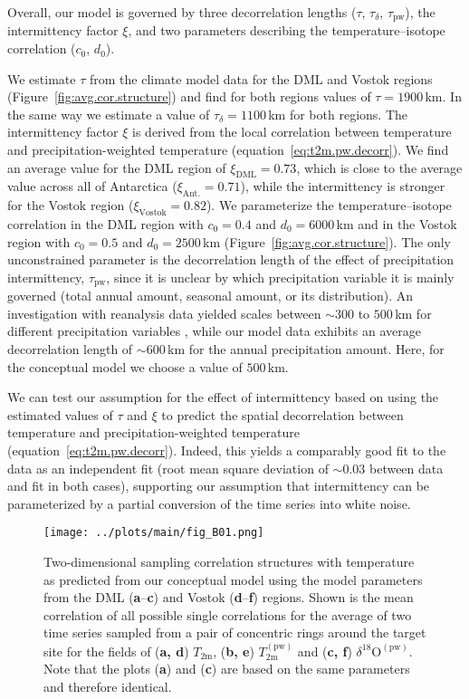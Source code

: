 \documentclass[draft]{agujournal2019}
\begin{document}
Overall, our model is governed by three decorrelation lengths ($\tau$,
$\tau_{\delta}$, $\tau_{\mathrm{pw}}$), the intermittency factor $\xi$, and two
parameters describing the temperature--isotope correlation ($c_0$, $d_0$).

We estimate $\tau$ from the climate model data for the DML and Vostok regions
(Figure~\ref{fig:avg.cor.structure}) and find for both regions values of
$\tau=1900$\,km. In the same way we estimate a value of $\tau_{\delta}=1100$\,km
for both regions. The intermittency factor $\xi$ is derived from the local
correlation between temperature and precipitation-weighted temperature
(equation~\ref{eq:t2m.pw.decorr}). We find an average value for the DML region
of $\xi_{\mathrm{DML}}=0.73$, which is close to the average value across all of
Antarctica ($\xi_{\mathrm{Ant.}}=0.71$), while the intermittency is stronger for
the Vostok region ($\xi_{\mathrm{Vostok}}=0.82$). We parameterize the
temperature--isotope correlation in the DML region with $c_0=0.4$ and
$d_0=6000$\,km and in the Vostok region with $c_0=0.5$ and $d_0=2500$\,km
(Figure~\ref{fig:avg.cor.structure}). The only unconstrained parameter is the
decorrelation length of the effect of precipitation intermittency,
$\tau_{\mathrm{pw}}$, since it is unclear by which precipitation variable it is
mainly governed (total annual amount, seasonal amount, or its distribution). An
investigation with reanalysis data yielded scales between $\sim300$ to $500$\,km
for different precipitation variables \cite{Munch2018a}, while our model data
exhibits an average decorrelation length of $\sim600$\,km for the annual
precipitation amount. Here, for the conceptual model we choose a value of
$500$\,km.

We can test our assumption for the effect of intermittency based on using the
estimated values of $\tau$ and $\xi$ to predict the spatial decorrelation
between temperature and precipitation-weighted temperature
(equation~\ref{eq:t2m.pw.decorr}). Indeed, this yields a comparably good fit to
the data as an independent fit (root mean square deviation of $\sim0.03$ between
data and fit in both cases), supporting our assumption that intermittency can be
parameterized by a partial conversion of the time series into white noise.

\begin{figure*}[t]%
\centering
\texttt{[image: ../plots/main/fig\_B01.png]}
\caption{%
  Two-dimensional sampling correlation structures with temperature as predicted
  from our conceptual model using the model parameters from the DML
  (\textbf{a}--\textbf{c}) and Vostok (\textbf{d}--\textbf{f}) regions. Shown
  is the mean correlation of all possible single correlations for the average of
  two time series sampled from a pair of concentric rings around the target site
  for the fields of (\textbf{a, d}) $T_{\mathrm{2m}}$, (\textbf{b, e})
  $T_{\mathrm{2m}}^{\mathrm{(pw)}}$ and (\textbf{c, f})
  $\delta^{18}\mathrm{O}^{\mathrm{(pw)}}$. Note that the plots (\textbf{a}) and
  (\textbf{c}) are based on the same parameters and therefore identical.}
\label{fig:conceptual.model}%
\end{figure*}%
\end{document}

